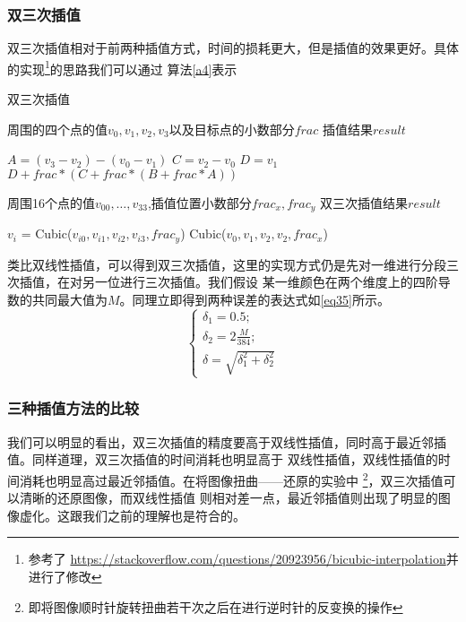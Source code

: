 \documentclass[UTF8,a4paper]{paper}\usepackage[utf8]{inputenc}\usepackage{algorithm}
\begin{document}
\subsubsection{双三次插值}
双三次插值相对于前两种插值方式，时间的损耗更大，但是插值的效果更好。具体的实现\footnote{参考了
\url{https://stackoverflow.com/questions/20923956/bicubic-interpolation}并进行了修改}的思路我们可以通过
算法\ref{a4}表示
\begin{algorithm}[h]\caption{双三次插值}\label{a4}\begin{algorithmic}
    \Require 周围的四个点的值$v_0,v_1,v_2,v_3$以及目标点的小数部分$frac$
    \Ensure 插值结果$result$\end{algorithmic}\begin{algorithmic}[1]
    \State $A = (v_3-v_2)-(v_0-v_1)$
    \State $C = v_2 - v_0$
    \State $D = v_1$
    \State \Return $D + frac * (C + frac * (B + frac * A))$
    \EndFunction\end{algorithmic}\begin{algorithmic}
    \State \State \State
    \Require 周围16个点的值$v_{00},\hdots,v_{33}$,插值位置小数部分$frac_x,frac_y$
    \Ensure 双三次插值结果$result$\end{algorithmic}\begin{algorithmic}[1]
        \State $v_i$ = Cubic($v_{i0},v_{i1},v_{i2},v_{i3},frac_y$)
    \EndFor
    \State \Return Cubic($v_0,v_1,v_2,v_2,frac_x$)
    \EndFunction
    \end{algorithmic}
\end{algorithm}
类比双线性插值，可以得到双三次插值，这里的实现方式仍是先对一维进行分段三次插值，在对另一位进行三次插值。我们假设
某一维颜色在两个维度上的四阶导数的共同最大值为$M$。同理立即得到两种误差的表达式如\ref{eq35}所示。
\begin{equation}\begin{cases}
\delta_1 = 0.5;\\
\delta_2 = 2\frac{M}{384};\\
\delta = \sqrt{\delta_1^2 + \delta_2^2}
\end{cases}\end{equation}
\subsubsection{三种插值方法的比较}
我们可以明显的看出，双三次插值的精度要高于双线性插值，同时高于最近邻插值。同样道理，双三次插值的时间消耗也明显高于
双线性插值，双线性插值的时间消耗也明显高过最近邻插值。在将图像扭曲——还原的实验中
\footnote{即将图像顺时针旋转扭曲若干次之后在进行逆时针的反变换的操作}，双三次插值可以清晰的还原图像，而双线性插值
则相对差一点，最近邻插值则出现了明显的图像虚化。这跟我们之前的理解也是符合的。
\end{document}
